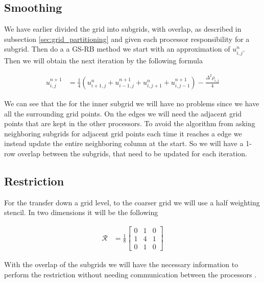 	\subsection{Smoothing}

		We have earlier divided the grid into subgrids, with overlap, as described
		in subsection \ref{sec:grid_partitioning} and given each processor
		responsibility for a subgrid. Then do a a GS-RB method we start with an
		approximation of \(u^{n}_{i,j}\). Then we will obtain the next iteration by
		the following formula

		\begin{align}
			u^{n+1}_{i,j} &= \frac{1}{4}\left( u^n_{i+1,j} + u^{n +1}_{i-1,j} + u^{n}_{i, j+1} + u^{n+1}_{i,j-1}  \right) - \frac{\Delta^2 \rho_{i,j}}{4}
		\end{align}

		We can see that the for the inner subgrid we will have no problems since we
		have all the surrounding grid points. On the edges we will need the adjacent
		grid points that are kept in the other processors. To avoid the algorithm
		from asking neighboring subgrids for adjacent grid points each time it
		reaches a edge we instead update the entire neighboring column at the start.
		So we will have a 1-row overlap between the subgrids, that need to be updated
		for each iteration.


	\subsection{Restriction}
		For the transfer down a grid level, to the coarser grid we will use a half
		weighting stencil. In two dimensions it will be the following

		\begin{align}
			\mathcal{R} &= \frac{1}{8}
			\begin{bmatrix}
				0 & 1 & 0
				\\
				1 & 4 & 1
				\\
				0 & 1 & 0
			\end{bmatrix}
		\end{align}

		With the overlap of the subgrids we will have the necessary information to
		perform the restriction without needing communication between the processors
		\citep{hackbusch_multigrid_1982}.

